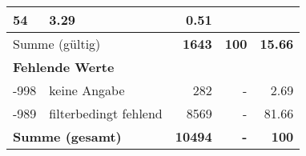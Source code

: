 \begin{longtable}{lXrrr}
       \num{54} &
       \num[round-mode=places,round-precision=2]{3.29} &
         \num[round-mode=places,round-precision=2]{0.51} \\
     \midrule
     \multicolumn{2}{l}{Summe (gültig)} &
       \textbf{\num{1643}} &
     \textbf{\num{100}} &
       \textbf{\num[round-mode=places,round-precision=2]{15.66}} \\
     \multicolumn{5}{l}{\textbf{Fehlende Werte}}\\
       -998 &
       keine Angabe &
         \num{282} &
        - &
         \num[round-mode=places,round-precision=2]{2.69} \\
       -989 &
       filterbedingt fehlend &
         \num{8569} &
        - &
         \num[round-mode=places,round-precision=2]{81.66} \\
     \midrule
     \multicolumn{2}{l}{\textbf{Summe (gesamt)}} &
          \textbf{\num{10494}} &
        \textbf{-} &
        \textbf{\num{100}} \\
     \bottomrule
     \end{longtable}
     
